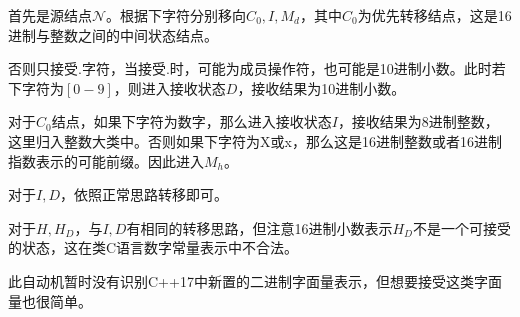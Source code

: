 \documentclass[UTF8]{ctexart}
\begin{document}
\par 首先是源结点$\mathcal{N}$。根据下字符分别移向$C_0,I,M_d$，其中$C_0$为优先转移结点，这是16进制与整数之间的中间状态结点。
\par 否则只接受$.$字符，当接受$.$时，可能为成员操作符，也可能是10进制小数。此时若下字符为$[0-9]$，则进入接收状态$D$，接收结果为10进制小数。
\par 对于$C_0$结点，如果下字符为数字，那么进入接收状态$I$，接收结果为8进制整数，这里归入整数大类中。否则如果下字符为X或x，那么这是16进制整数或者16进制指数表示的可能前缀。因此进入$M_h$。
\par 对于$I,D$，依照正常思路转移即可。
\par 对于$H,H_D$，与$I,D$有相同的转移思路，但注意16进制小数表示$H_D$不是一个可接受的状态，这在类C语言数字常量表示中不合法。
\par 此自动机暂时没有识别C++17中新置的二进制字面量表示，但想要接受这类字面量也很简单。
\end{document}
